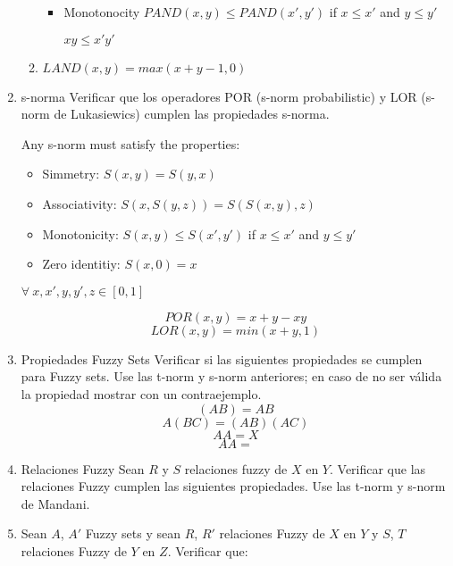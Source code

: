 \documentclass[10pt, conference, compsocconf]{IEEEtranBST/IEEEtran}
\begin{document}
\begin{enumerate}
\begin{enumerate}
\begin{itemize}
\item Monotonocity
$PAND(x,y) \leq PAND(x',y')$ if $x\leq x'$ and $y\leq y'$

$xy \leq x'y'$

\end{itemize}
\item $LAND(x,y)=max(x+y-1,0)$
\end{enumerate}


\item s-norma
Verificar que los operadores POR (s-norm probabilistic) y LOR (s-norm de Lukasiewics) cumplen las propiedades s-norma.


Any s-norm must satisfy the properties:
\begin{itemize}
\item Simmetry: $S(x,y)=S(y,x)$
\item Associativity: $S(x,S(y,z))=S(S(x,y),z)$
\item Monotonicity: $S(x,y) \leq S(x',y')$ if $x\leq x'$ and $y\leq y'$
\item Zero identitiy: $S(x,0)=x$
\end{itemize}
$\forall \ x,x',y,y',z \in [0,1]$

$$POR(x,y)=x+y-xy$$
$$LOR(x,y)=min(x+y,1)$$

\item Propiedades Fuzzy Sets
Verificar si las siguientes propiedades se cumplen para Fuzzy sets. Use las t-norm y s-norm anteriores; en caso de no ser v\'{a}lida la propiedad mostrar con un contraejemplo.
$$(A B)= A B$$
$$A (B C)= (A B)(A C)$$
$$A A = X$$
$$A A= $$

\item Relaciones Fuzzy
Sean $R$ y $S$ relaciones fuzzy de $X$ en $Y$. Verificar que las relaciones Fuzzy cumplen las siguientes propiedades. Use las t-norm y s-norm de Mandani.

\item Sean $A$, $A'$ Fuzzy sets y sean $R$, $R'$ relaciones Fuzzy de $X$ en $Y$ y $S$, $T$ relaciones Fuzzy de $Y$ en $Z$. Verificar que:

\end{enumerate}
\end{document}
